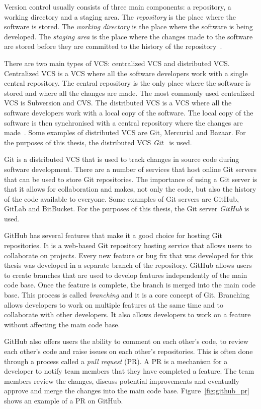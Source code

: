 Version control usually consists of three main components: a repository, a
working directory and a staging area.
The \textit{repository} is the place where the software is stored.
The \textit{working directory} is the place where the software is being
developed.
The \textit{staging area} is the place where the changes made to the software
are stored before they are committed to the history of the
repository~\cite{blischak2016quick}.

There are two main types of VCS: centralized VCS and distributed VCS.
Centralized VCS is a VCS where all the software developers work with a single
central repository.
The central repository is the only place where the software is stored and
where all the changes are made.
The most commonly used centralized VCS is Subversion and CVS.
The distributed VCS is a VCS where all the software developers work with a
local copy of the software.
The local copy of the software is then synchronised with a central repository
where the changes are made~\cite{zolkifli2018version}.
Some examples of distributed VCS are Git, Mercurial and Bazaar.
For the purposes of this thesis, the distributed VCS
\textit{Git}~\cite{spinellis2012git} is used.

Git is a distributed VCS that is used to track changes in source code during
software development.
There are a number of services that host online Git servers that can be used to
store Git repositories.
The importance of using a Git server is that it allows for collaboration and
makes, not only the code, but also the history of the code available to
everyone.
Some examples of Git servers are GitHub, GitLab and BitBucket.
For the purposes of this thesis, the Git server \textit{GitHub} is used.

GitHub has several features that make it a good choice for hosting Git
repositories.
It is a web-based Git repository hosting service that allows users to
collaborate on projects.
Every new feature or bug fix that was developed for this thesis was developed
in a separate branch of the repository.
GitHub allows users to create branches that are used to develop features
independently of the main code base.
Once the feature is complete, the branch is merged into the main code base.
This process is called \textit{branching} and it is a core concept of Git.
Branching allows developers to work on multiple features at the same time and
to collaborate with other developers.
It also allows developers to work on a feature without affecting the main code
base.

GitHub also offers users the ability to comment on each other's code, to review
each other's code and raise issues on each other's repositories.
This is often done through a process called a \textit{pull request} (PR).
A PR is a mechanism for a developer to notify team members that they have
completed a feature.
The team members review the changes, discuss potential improvements and
eventually approve and merge the changes into the main code base.
Figure~\ref{fig:github_pr} shows an example of a PR on GitHub.

